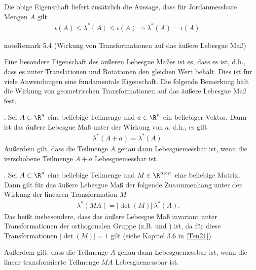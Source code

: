 \documentclass[letterpaper,10pt,german]{jupyterBook}
\begin{document}
\sphinxAtStartPar
Die obige Eigenschaft liefert zusätzlich die Aussage, dass für Jordan\sphinxhyphen{}messbare Mengen \(A\) gilt
\begin{equation*}
\begin{split}\iota(A)\leq\lambda^\ast(A)\leq\iota(A)\Rightarrow \lambda^\ast(A) = \iota(A).\end{split}
\end{equation*}\label{masstheorie/masstheorie:rem:transinvariance}
\begin{sphinxadmonition}{note}{Remark 5.4 (Wirkung von Transformationen auf das äußere Lebesgue Maß)}



\sphinxAtStartPar
Eine besondere Eigenschaft des äußeren Lebesgue Maßes ist es, dass es  ist, d.h., dass es unter Translationen und Rotationen den gleichen Wert behält.
Dies ist für viele Anwendungen eine fundamentale Eigenschaft.
Die folgende Bemerkung hält die Wirkung von geometrischen Transformationen auf das äußere Lebesgue Maß fest.

. Sei \(A \subset \R^n\) eine beliebige Teilmenge und \(a \in \R^n\) ein beliebiger Vektor.
Dann ist das äußere Lebesgue Maß  unter der Wirkung von \(a\), d.h., es gilt
\begin{equation*}
\begin{split}\lambda^*(A + a) = \lambda^*(A).\end{split}
\end{equation*}
\sphinxAtStartPar
Außerdem gilt, dass die Teilmenge \(A\) genau dann Lebesgue\sphinxhyphen{}messbar ist, wenn die verschobene Teilmenge \(A + a\) Lebesgue\sphinxhyphen{}messbar ist.

. Sei \(A \subset \R^n\) eine beliebige Teilmenge und \(M \in \R^{n\times n}\) eine beliebige Matrix.
Dann gilt für das äußere Lebesgue Maß der folgende Zusammenhang unter der Wirkung der linearen Transformation \(M\)
\begin{equation*}
\begin{split}\lambda^*(MA) = |\!\operatorname{det}(M)| \, \lambda^*(A).\end{split}
\end{equation*}
\sphinxAtStartPar
Das heißt insbesondere, dass das äußere Lebesgue Maß invariant unter Transformationen der orthogonalen Gruppe (z.B.  und ) ist, da für diese Transformationen \(|\!\operatorname{det}(M)| = 1\) gilt (siehe Kapitel 3.6 in {[}\hyperlink{cite.references:id15}{Ten21}{]}).

\sphinxAtStartPar
Außerdem gilt, dass die Teilmenge \(A\) genau dann Lebesgue\sphinxhyphen{}messbar ist, wenn die linear transformierte Teilmenge \(MA\) Lebesgue\sphinxhyphen{}messbar ist.
\end{sphinxadmonition}
\end{document}
